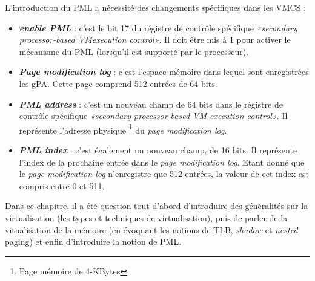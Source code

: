 \par\noindent L'introduction du PML a nécessité des changements spécifiques dans les \acs{VMCS}
 : 
\begin{itemize}
    \item \textit{\textbf{enable PML}} : c'est le bit 17 du régistre de contrôle spécifique \textit{«secondary processor-based VMexecution control»}. Il doit être mis à 1 pour activer le mécanisme du PML (lorsqu'il est supporté par le processeur).
    \item \textit{\textbf{Page modification log}} : c'est l'espace mémoire dans lequel sont enregistrées les \acs{gPA}. Cette page comprend 512 entrées de 64 bits.
    \item \textit{\textbf{PML address}} : c'est un nouveau champ de 64 bits dans le régistre de contrôle spécifique \textit{«secondary processor-based VM execution control»}. Il représente l'adresse physique \footnote{Page mémoire de 4-KBytes} du \textit{page modification log}.
    \item \textit{\textbf{PML index}} : c'est également un nouveau champ, de 16 bits. Il représente l'index de la prochaine entrée dans le \textit{page modification log}. Etant donné que le \textit{page modification log} n'enregistre que 512 entrées, la valeur de cet index est compris entre 0 et 511.
\end{itemize}

\par\noindent Dans ce chapitre, il a été question tout d'abord d'introduire des généralités sur la \break virtualisation (les types et techniques de virtualisation), puis de parler de la vitualisation de la mémoire (en évoquant les notions de TLB, \emph{shadow} et \emph{nested} paging) et enfin d'introduire la notion de PML.